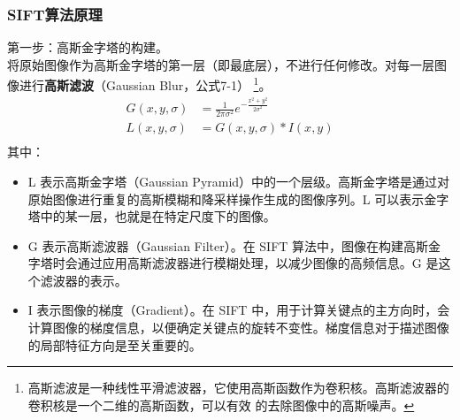 \documentclass{nwputhesis}
\begin{document}
\subsubsection{SIFT算法原理}
\noindent
第一步：高斯金字塔的构建。\\
\indent
将原始图像作为高斯金字塔的第一层（即最底层），不进行任何修改。对每一层图像进行\textbf{高斯滤波}（Gaussian Blur，公式7-1）
\footnote{高斯滤波是一种线性平滑滤波器，它使用高斯函数作为卷积核。高斯滤波器的卷积核是一个二维的高斯函数，可以有效
的去除图像中的高斯噪声。}。
\hypertarget{公式7-1}{}
\begin{equation}
    \begin{aligned}
        G(x,y,\sigma) &= \frac{1}{2\pi\sigma^2}e^{-\frac{x^2+y^2}{2\sigma^2}}\\
        L(x,y,\sigma) &= G(x,y,\sigma) * I(x,y)\\
    \end{aligned}
\end{equation}
\indent
其中：
\begin{itemize}
    \item L 表示高斯金字塔（Gaussian Pyramid）中的一个层级。高斯金字塔是通过对原始图像进行重复的高斯模糊和降采样操作生成的图像序列。L 可以表示金字塔中的某一层，也就是在特定尺度下的图像。
    \item G 表示高斯滤波器（Gaussian Filter）。在 SIFT 算法中，图像在构建高斯金字塔时会通过应用高斯滤波器进行模糊处理，以减少图像的高频信息。G 是这个滤波器的表示。
    \item I 表示图像的梯度（Gradient）。在 SIFT 中，用于计算关键点的主方向时，会计算图像的梯度信息，以便确定关键点的旋转不变性。梯度信息对于描述图像的局部特征方向是至关重要的。
\end{itemize}
\end{document}
